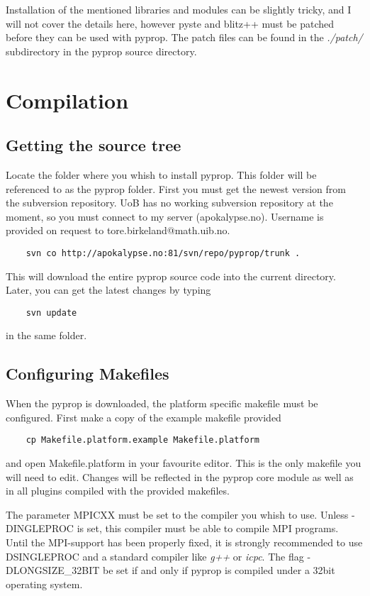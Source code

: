 Installation of the mentioned libraries and modules can be slightly tricky, and I will not cover the details here, 
however pyste and blitz++ must be patched before they can be used with pyprop. The patch files can be found in 
the \textit{./patch/} subdirectory in the pyprop source directory.

\section{Compilation}
\subsection*{Getting the source tree}
Locate the folder where you whish to install pyprop. This folder will be referenced to as the pyprop folder.
First you must get the newest version from the subversion repository. UoB has no working subversion repository at
the moment, so you must connect to my server (apokalypse.no). Username is provided on request to 
tore.birkeland@math.uib.no. 
\begin{verbatim}
	svn co http://apokalypse.no:81/svn/repo/pyprop/trunk .
\end{verbatim}
This will download the entire pyprop source code into the current directory. Later, you can get the latest
changes by typing
\begin{verbatim}
	svn update
\end{verbatim}
in the same folder.

\subsection*{Configuring Makefiles}
When the pyprop is downloaded, the platform specific makefile must be configured. First make
a copy of the example makefile provided
\begin{verbatim}
	cp Makefile.platform.example Makefile.platform
\end{verbatim}
and open Makefile.platform in your favourite editor. This is the only makefile you will need to edit. 
Changes will be reflected in the pyprop core module as well as in all plugins compiled with the provided
makefiles.

The parameter MPICXX must be set to the compiler you whish to use. Unless -DINGLEPROC is set, this compiler
must be able to compile MPI programs. Until the MPI-support has been properly fixed, it is strongly recommended
to use \-DSINGLEPROC and a standard compiler like \textit{g++} or \textit{icpc}.
The flag -DLONGSIZE\_32BIT be set if and only if pyprop is compiled under a 32bit operating system.

